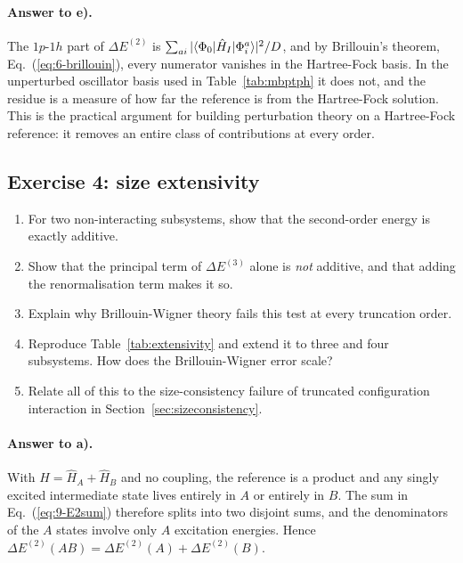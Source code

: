 \paragraph{Answer to e).}
The $1p$-$1h$ part of $\Delta E^{(2)}$ is
$\sum_{ai}|\langle \Phi_0 | \hat{H}_I | \Phi_i^a \rangle|^2/D$, and by Brillouin's
theorem, Eq.~(\ref{eq:6-brillouin}), every numerator vanishes in the
Hartree-Fock basis.  In the unperturbed oscillator basis used in
Table~\ref{tab:mbptph} it does not, and the residue is a measure of how far
the reference is from the Hartree-Fock solution.  This is the practical
argument for building perturbation theory on a Hartree-Fock reference: it
removes an entire class of contributions at every order.

\subsection*{Exercise 4: size extensivity}
\label{ex:9-extensivity}

\begin{enumerate}
  \item[a)] For two non-interacting subsystems, show that the second-order
  energy is exactly additive.
  \item[b)] Show that the principal term of $\Delta E^{(3)}$ alone is
  \emph{not} additive, and that adding the renormalisation term makes it so.
  \item[c)] Explain why Brillouin-Wigner theory fails this test at every
  truncation order.
  \item[d)] Reproduce Table~\ref{tab:extensivity} and extend it to three and
  four subsystems.  How does the Brillouin-Wigner error scale?
  \item[e)] Relate all of this to the size-consistency failure of truncated
  configuration interaction in Section~\ref{sec:sizeconsistency}.
\end{enumerate}

\paragraph{Answer to a).}
With $\hat{H}=\hat{H}_A+\hat{H}_B$ and no coupling, the reference is a
product and any singly excited intermediate state lives entirely in $A$ or
entirely in $B$.  The sum in Eq.~(\ref{eq:9-E2sum}) therefore splits into two
disjoint sums, and the denominators of the $A$ states involve only $A$
excitation energies.  Hence $\Delta E^{(2)}(AB)=\Delta E^{(2)}(A)
+\Delta E^{(2)}(B)$.

